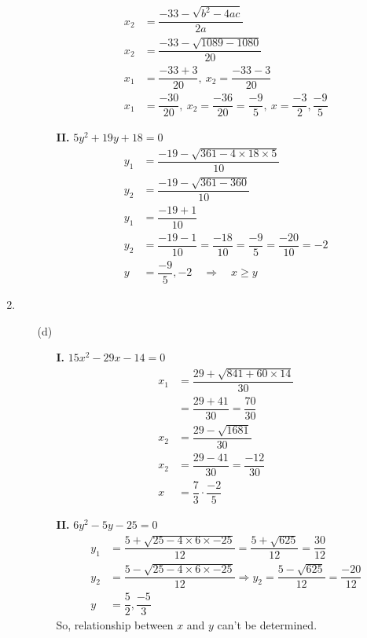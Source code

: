 \begin{multicols}{2}
\begin{enumerate}
\begin{itemize}
\begin{itemize}
\begin{align*}
  x_2 & = \dfrac{-33 - \sqrt{b^2 - 4ac}}{2a}\\
  x_2 & = \dfrac{-33 - \sqrt{1089 - 1080}}{20}\\
  x_1 & = \dfrac{-33 + 3}{20},\ x_2 = \dfrac{-33 - 3}{20}\\
  x_1 & = \dfrac{-30}{20},\ x_2 = \dfrac{-36}{20} = \dfrac{-9}{5},\ x = \dfrac{-3}{2}, \dfrac{-9}{5}
\end{align*}
\item[{\bf II.}] $5y^2 + 19y + 18 = 0$
\begin{align*}
  y_1 & = \dfrac{-19 - \sqrt{361 - 4 \times 18 \times 5}}{10}\\
  y_2 & = \dfrac{-19 - \sqrt{361 - 360}}{10}\\
  y_1 & = \dfrac{-19 + 1}{10}\\
  y_2 & = \dfrac{-19 - 1}{10} = \dfrac{-18}{10} = \dfrac{-9}{5} = \dfrac{-20}{10} = -2\\
  y & = \dfrac{-9}{5}, -2 \quad \Rightarrow \quad x \geq y
\end{align*}
\end{itemize}
\end{itemize}
\item
\begin{itemize}
\item[(d)]
\begin{itemize}
\item[{\bf I.}] $15x^2 - 29x - 14 = 0$
  \begin{align*}
    x_1 & = \dfrac{29 + \sqrt{841 + 60 \times 14}}{30}\\
    & = \dfrac{29 + 41}{30} = \dfrac{70}{30}\\
    x_2 & = \dfrac{29 - \sqrt{1681}}{30}\\
    x_2 & = \dfrac{29 - 41}{30} = \dfrac{-12}{30}\\
    x & = \dfrac{7}{3} \cdot \dfrac{-2}{5}
  \end{align*}
\item[{\bf II.}] $6y^2 - 5y - 25 = 0$
\begin{align*}
 y_1 & = \dfrac{5 + \sqrt{25 - 4 \times 6 \times -25}}{12} = \dfrac{5 + \sqrt{625}}{12} = \dfrac{30}{12}\\
 y_2 & = \dfrac{5 - \sqrt{25 - 4 \times 6 \times -25}}{12} \Rightarrow y_2 = \dfrac{5 - \sqrt{625}}{12} = \dfrac{-20}{12}\\
 y & = \dfrac{5}{2}, \dfrac{-5}{3}
\end{align*}
So, relationship between $x$ and $y$ can't be determined.
\end{itemize}

\end{itemize}
\end{enumerate}
\end{multicols}
